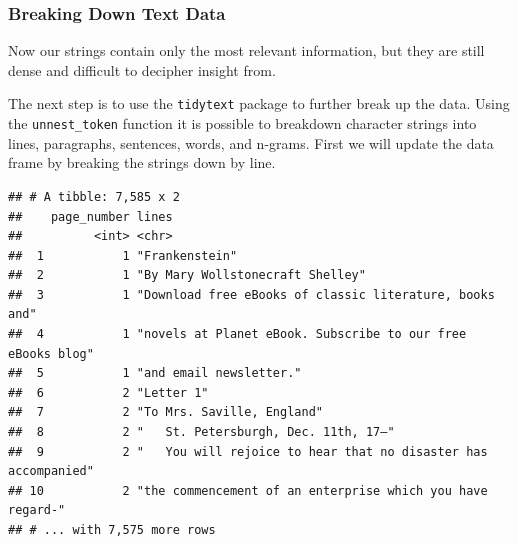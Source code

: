 \documentclass[]{article}
\newenvironment{Shaded}{\begin{snugshade}}{\end{snugshade}}
\newcommand{\DataTypeTok}[1]{\textcolor[rgb]{0.13,0.29,0.53}{#1}}
\newcommand{\KeywordTok}[1]{\textcolor[rgb]{0.13,0.29,0.53}{\textbf{#1}}}
\newcommand{\NormalTok}[1]{#1}
\newcommand{\OperatorTok}[1]{\textcolor[rgb]{0.81,0.36,0.00}{\textbf{#1}}}
\newcommand{\StringTok}[1]{\textcolor[rgb]{0.31,0.60,0.02}{#1}}
\begin{document}
\hypertarget{breaking-down-text-data}{%
\subsubsection{Breaking Down Text Data}\label{breaking-down-text-data}}

Now our strings contain only the most relevant information, but they are
still dense and difficult to decipher insight from.

The next step is to use the \texttt{tidytext} package to further break
up the data. Using the \texttt{unnest\_token} function it is possible to
breakdown character strings into lines, paragraphs, sentences, words,
and n-grams. First we will update the data frame by breaking the strings
down by line.

\begin{Shaded}
\end{Shaded}

\begin{verbatim}
## # A tibble: 7,585 x 2
##    page_number lines                                                         
##          <int> <chr>                                                         
##  1           1 "Frankenstein"                                                
##  2           1 "By Mary Wollstonecraft Shelley"                              
##  3           1 "Download free eBooks of classic literature, books and"       
##  4           1 "novels at Planet eBook. Subscribe to our free eBooks blog"   
##  5           1 "and email newsletter."                                       
##  6           2 "Letter 1"                                                    
##  7           2 "To Mrs. Saville, England"                                    
##  8           2 "   St. Petersburgh, Dec. 11th, 17—"                          
##  9           2 "   You will rejoice to hear that no disaster has accompanied"
## 10           2 "the commencement of an enterprise which you have regard-"    
## # ... with 7,575 more rows
\end{verbatim}
\end{document}
